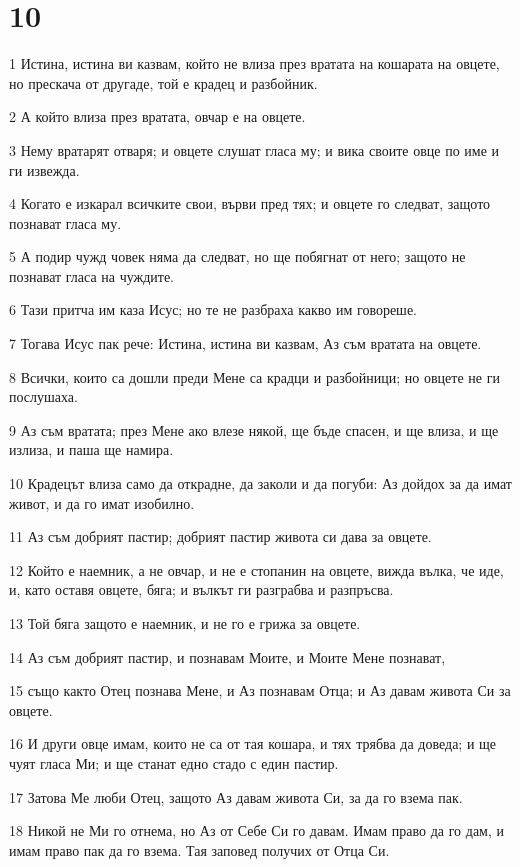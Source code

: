 \chapter{10}

\par 1 Истина, истина ви казвам, който не влиза през вратата на кошарата на овцете, но прескача от другаде, той е крадец и разбойник.
\par 2 А който влиза през вратата, овчар е на овцете.
\par 3 Нему вратарят отваря; и овцете слушат гласа му; и вика своите овце по име и ги извежда.
\par 4 Когато е изкарал всичките свои, върви пред тях; и овцете го следват, защото познават гласа му.
\par 5 А подир чужд човек няма да следват, но ще побягнат от него; защото не познават гласа на чуждите.
\par 6 Тази притча им каза Исус; но те не разбраха какво им говореше.
\par 7 Тогава Исус пак рече: Истина, истина ви казвам, Аз съм вратата на овцете.
\par 8 Всички, които са дошли преди Мене са крадци и разбойници; но овцете не ги послушаха.
\par 9 Аз съм вратата; през Мене ако влезе някой, ще бъде спасен, и ще влиза, и ще излиза, и паша ще намира.
\par 10 Крадецът влиза само да открадне, да заколи и да погуби: Аз дойдох за да имат живот, и да го имат изобилно.
\par 11 Аз съм добрият пастир; добрият пастир живота си дава за овцете.
\par 12 Който е наемник, а не овчар, и не е стопанин на овцете, вижда вълка, че иде, и, като оставя овцете, бяга; и вълкът ги разграбва и разпръсва.
\par 13 Той бяга защото е наемник, и не го е грижа за овцете.
\par 14 Аз съм добрият пастир, и познавам Моите, и Моите Мене познават,
\par 15 също както Отец познава Мене, и Аз познавам Отца; и Аз давам живота Си за овцете.
\par 16 И други овце имам, които не са от тая кошара, и тях трябва да доведа; и ще чуят гласа Ми; и ще станат едно стадо с един пастир.
\par 17 Затова Ме люби Отец, защото Аз давам живота Си, за да го взема пак.
\par 18 Никой не Ми го отнема, но Аз от Себе Си го давам. Имам право да го дам, и имам право пак да го взема. Тая заповед получих от Отца Си.
